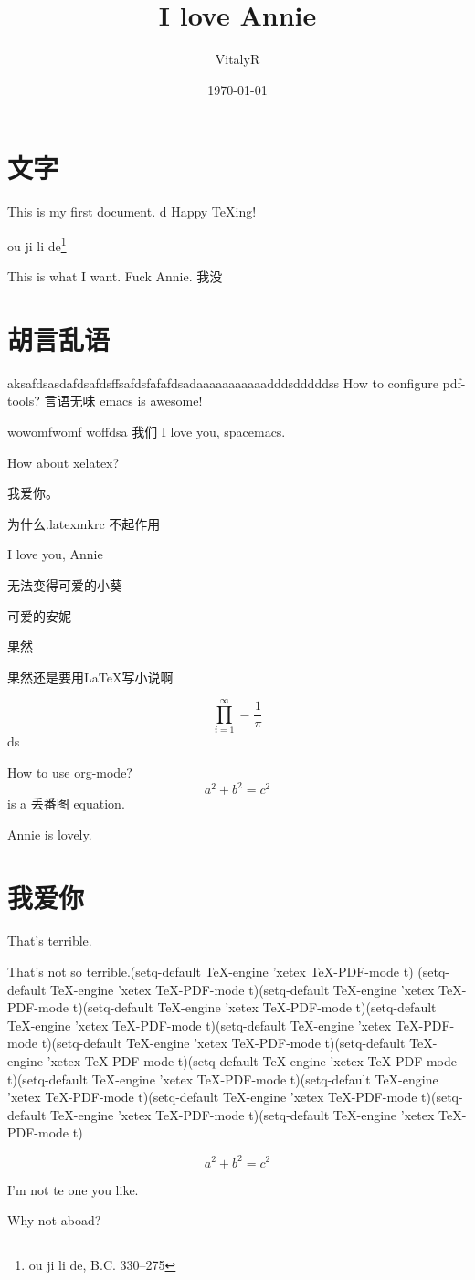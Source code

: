 \message{ !name(try_latex.tex)}\documentclass[UTF8]{ctexart}
\title{I love Annie}
\author{VitalyR}
\date{\today}
\begin{document}

\maketitle
\tableofcontents

\section{文字}
This is my first document.
d
Happy \TeX ing!

ou ji li de\footnote{ou ji li de, B.C. 330--275}

This is what I want.
Fuck Annie.
我没 

\section{胡言乱语}

aksafdsasdafdsafdsffsafdsfafafdsadaaaaaaaaaaadddsdddddss
How to configure pdf-tools?
言语无味
emacs is awesome!

wowomfwomf woffdsa
我们
I love you, spacemacs.


How about xelatex?

我爱你。

为什么.latexmkrc 不起作用

I love you, Annie

无法变得可爱的小葵

可爱的安妮

果然

果然还是要用\LaTeX 写小说啊


\begin{equation}
  \prod_{i=1}^{\infty}=\frac{1}{\pi}
  \end{equation}
  ds

How to use org-mode?
\[a^{2}+b^{2}=c^{2}\] is a 丢番图 equation.


Annie is lovely.




\section{我爱你}
That's terrible.

That's not so terrible.(setq-default TeX-engine 'xetex
              TeX-PDF-mode t)
(setq-default TeX-engine 'xetex
              TeX-PDF-mode t)(setq-default TeX-engine 'xetex
              TeX-PDF-mode t)(setq-default TeX-engine 'xetex
              TeX-PDF-mode t)(setq-default TeX-engine 'xetex
              TeX-PDF-mode t)(setq-default TeX-engine 'xetex
              TeX-PDF-mode t)(setq-default TeX-engine 'xetex
              TeX-PDF-mode t)(setq-default TeX-engine 'xetex
              TeX-PDF-mode t)(setq-default TeX-engine 'xetex
              TeX-PDF-mode t)(setq-default TeX-engine 'xetex
              TeX-PDF-mode t)(setq-default TeX-engine 'xetex
              TeX-PDF-mode t)(setq-default TeX-engine 'xetex
              TeX-PDF-mode t)(setq-default TeX-engine 'xetex
              TeX-PDF-mode t)(setq-default TeX-engine 'xetex
              TeX-PDF-mode t)

\begin{equation}
\label{eq:2}
a^{2}+b^{2}=c^{2}
\end{equation}


I'm not te one you like.

Why not aboad?
\end{document}

